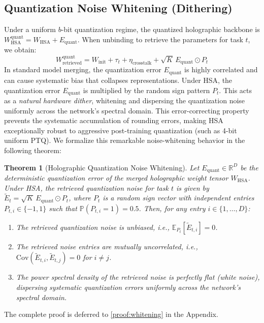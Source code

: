 \documentclass{article}
\theoremstyle{plain}
\newtheorem{theorem}{Theorem}[section]
\theoremstyle{definition}
\theoremstyle{remark}
\begin{document}
\subsection{Quantization Noise Whitening (Dithering)}
Under a uniform $b$-bit quantization regime, the quantized holographic backbone is $W_\text{HSA}^\text{quant} = W_\text{HSA} + E_\text{quant}$. When unbinding to retrieve the parameters for task $t$, we obtain:
\begin{equation}
    W_\text{retrieved}^\text{quant} = W_\text{init} + \tau_t + \eta_\text{crosstalk} + \sqrt{K} \, E_\text{quant} \odot P_t
\end{equation}
In standard model merging, the quantization error $E_\text{quant}$ is highly correlated and can cause systematic bias that collapses representations. Under HSA, the quantization error $E_\text{quant}$ is multiplied by the random sign pattern $P_t$. This acts as a \emph{natural hardware dither}, whitening and dispersing the quantization noise uniformly across the network's spectral domain. This error-correcting property prevents the systematic accumulation of rounding errors, making HSA exceptionally robust to aggressive post-training quantization (such as 4-bit uniform PTQ). We formalize this remarkable noise-whitening behavior in the following theorem:

\begin{theorem}[Holographic Quantization Noise Whitening]
\label{thm:whitening}
Let $E_\text{quant} \in \mathbb{R}^D$ be the deterministic quantization error of the merged holographic weight tensor $W_\text{HSA}$. Under HSA, the retrieved quantization noise for task $t$ is given by $\tilde{E}_t = \sqrt{K} \, E_\text{quant} \odot P_t$, where $P_t$ is a random sign vector with independent entries $P_{t,i} \in \{-1, 1\}$ such that $\mathbb{P}(P_{t,i} = 1) = 0.5$. Then, for any entry $i \in \{1, \dots, D\}$:
\begin{enumerate}
    \item The retrieved quantization noise is unbiased, i.e., $\mathbb{E}_{P_t}[\tilde{E}_{t,i}] = 0$.
    \item The retrieved noise entries are mutually uncorrelated, i.e., $\text{Cov}(\tilde{E}_{t,i}, \tilde{E}_{t,j}) = 0$ for $i \neq j$.
    \item The power spectral density of the retrieved noise is perfectly flat (white noise), dispersing systematic quantization errors uniformly across the network's spectral domain.
\end{enumerate}
\end{theorem}
The complete proof is deferred to \cref{proof:whitening} in the Appendix.
\end{document}
